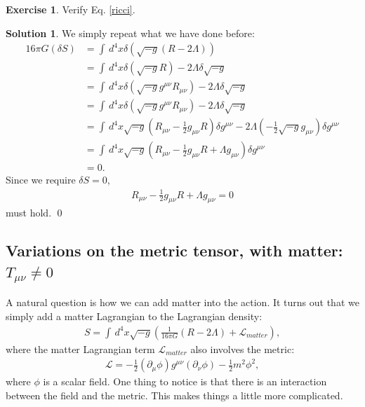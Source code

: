 \documentclass{book}
\numberwithin{equation}{section}
\theoremstyle{definition}
\newtheorem{exmp}{Exercise}[section]
\newtheorem{sln}{Solution}[section]
\newcommand{\p}{\partial}
\newcommand{\lag}{\mathcal{L}}
\newcommand{\nn}{\nonumber}
\newcommand{\f}[2]{\frac{#1}{#2}}
\newcommand{\lp}{\left(}
\newcommand{\rp}{\right)}
\begin{document}
\begin{exmp}
	Verify Eq. \eqref{ricci}.\\
	
	\begin{sln}
		We simply repeat what we have done before:
		\begin{align}
		16 \pi G (\delta S) &= \int \, d^4x \delta \lp \sqrt{-g}(R - 2\Lambda) \rp \nn\\
		&= \int \, d^4x \delta (\sqrt{-g} R) - 2\Lambda \delta \sqrt{-g} \nn\\
		&= \int \, d^4x \delta \lp\sqrt{-g} g^{\mu\nu}R_{\mu\nu}\rp- 2\Lambda \delta \sqrt{-g} \nn\\
		&= \int \, d^4x \delta \lp\sqrt{-g} g^{\mu\nu}R_{\mu\nu}\rp- 2\Lambda \delta \sqrt{-g} \nn\\
		&= \int \, d^4x \sqrt{-g} \lp R_{\mu\nu} - \f{1}{2}g_{\mu\nu}R \rp \delta g^{\mu\nu}- 2\Lambda \lp -\f{1}{2}\sqrt{-g} g_{\mu\nu} \rp \delta g^{\mu\nu} \nn\\
		&= \int \, d^4x \sqrt{-g}\lp R_{\mu\nu} - \f{1}{2}g_{\mu\nu}R + \Lambda g_{\mu\nu} \rp \delta g^{\mu\nu}\nn\\
		&= 0.
		\end{align}
		Since we require $\delta S = 0$,
		\begin{align}
		R_{\mu\nu} - \f{1}{2}g_{\mu\nu}R + \Lambda g_{\mu\nu} = 0
		\end{align}
		must hold. \qed \\
	\end{sln}
\end{exmp}

















\subsection{Variations on the metric tensor, with matter: $T_{\mu\nu} \neq 0$}

A natural question is how we can add matter into the action. It turns out that we simply add a matter Lagrangian to the Lagrangian density:
\begin{align}
S = \int\,d^4x \sqrt{-g}\lp \f{1}{16\pi G}(R - 2\Lambda) + \lag_{matter} \rp,
\end{align}
where the matter Lagrangian term $\lag_{matter}$ also involves the metric:
\begin{align}
\lag = -\f{1}{2}(\p_\mu\phi)g^{\mu\nu}(\p_\nu\phi) - \f{1}{2}m^2\phi^2,
\end{align}
where $\phi$ is a scalar field. One thing to notice is that there is an interaction between the field and the metric. This makes things a little more complicated. 
\end{document}
